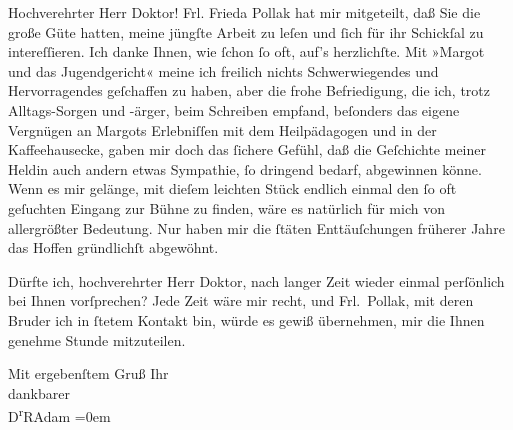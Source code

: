 \pstart{}Hochverehrter Herr Doktor!\pend\vspace{0.5em}
\pstart
           Frl. Frieda Pollak hat mir mitgeteilt, daß Sie
               die große Güte hatten, meine jüngſte Arbeit zu leſen und{ }ſich für ihr Schickſal zu
               intereſſieren. Ich danke Ihnen, wie{ }ſchon{ }ſo oft, auf’s herzlichſte. Mit »Margot und das Jugendgericht« meine ich freilich
               nichts Schwerwiegendes und Hervorragendes geſchaffen zu haben, aber die frohe
               Befriedigung, die ich, trotz Alltags-Sorgen und -ärger, beim Schreiben {\pb}empfand, beſonders das eigene Vergnügen an
                  Margots Erlebniſſen mit dem
               Heilpädagogen und in der Kaffeehausecke, gaben mir doch das{ }ſichere Gefühl, daß die
               Geſchichte meiner Heldin auch andern etwas Sympathie, \label{T_L02510-1v}\label{T_L02510-1}{ }ſo dringend
               bedarf, abgewinnen könne. Wenn es mir gelänge, mit dieſem leichten Stück endlich
               einmal den{ }ſo oft geſuchten Eingang zur Bühne zu finden, wäre es natürlich für mich
               von allergrößter Bedeutung. Nur haben mir die{ }ſtäten Enttäuſchungen früherer Jahre
               das Hoffen gründlichſt abgewöhnt.\pend
           
\pstart
           {\pb}Dürfte ich, hochverehrter Herr Doktor,
               nach langer Zeit wieder einmal perſönlich bei Ihnen vorſprechen? Jede Zeit wäre mir
               recht, und Frl. Pollak, mit deren Bruder ich in{ }ſtetem Kontakt
               bin, würde es gewiß übernehmen, mir die Ihnen genehme Stunde mitzuteilen.\pend
           
\pstart
           Mit ergebenſtem Gruß Ihr{\\[\baselineskip]}dankbarer{\\[\baselineskip]}\spacefill\mbox{D\textsuperscript{r}RAdam}\pend
           \leftskip=0em{}\endnumbering{}  \newcommand{\dateiname}{L02510}\newcommand{\titel}{Robert Adam an Arthur Schnitzler, 7. 6. 1929}\newcommand{\editorInnen}{Martin Anton Müller und Gerd-Hermann Susen}
